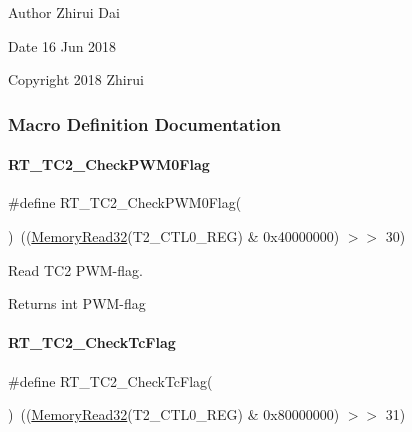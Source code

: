 \begin{DoxyAuthor}{Author}
Zhirui Dai 
\end{DoxyAuthor}
\begin{DoxyDate}{Date}
16 Jun 2018 
\end{DoxyDate}
\begin{DoxyCopyright}{Copyright}
2018 Zhirui 
\end{DoxyCopyright}


\subsubsection{Macro Definition Documentation}
\mbox{\label{a00047_a68bc636dca2736a8368cfd72ca9eb11a}} 
\paragraph{\texorpdfstring{R\+T\+\_\+\+T\+C2\+\_\+\+Check\+P\+W\+M0\+Flag}{RT\_TC2\_CheckPWM0Flag}}
{\footnotesize\ttfamily \#define R\+T\+\_\+\+T\+C2\+\_\+\+Check\+P\+W\+M0\+Flag(\begin{DoxyParamCaption}{ }\end{DoxyParamCaption})~((\mbox{\hyperlink{a00020_a706b02571285f92589fbb0b964d7d0bb}{Memory\+Read32}}(T2\+\_\+\+C\+T\+L0\+\_\+\+R\+EG) \& 0x40000000) $>$$>$ 30)}



Read T\+C2 P\+W\+M-\/flag. 

\begin{DoxyReturn}{Returns}
int P\+W\+M-\/flag 
\end{DoxyReturn}
\mbox{\label{a00047_ab9c273f7aaa4570b2a179b6711a50741}} 
\paragraph{\texorpdfstring{R\+T\+\_\+\+T\+C2\+\_\+\+Check\+Tc\+Flag}{RT\_TC2\_CheckTcFlag}}
{\footnotesize\ttfamily \#define R\+T\+\_\+\+T\+C2\+\_\+\+Check\+Tc\+Flag(\begin{DoxyParamCaption}{ }\end{DoxyParamCaption})~((\mbox{\hyperlink{a00020_a706b02571285f92589fbb0b964d7d0bb}{Memory\+Read32}}(T2\+\_\+\+C\+T\+L0\+\_\+\+R\+EG) \& 0x80000000) $>$$>$ 31)}



